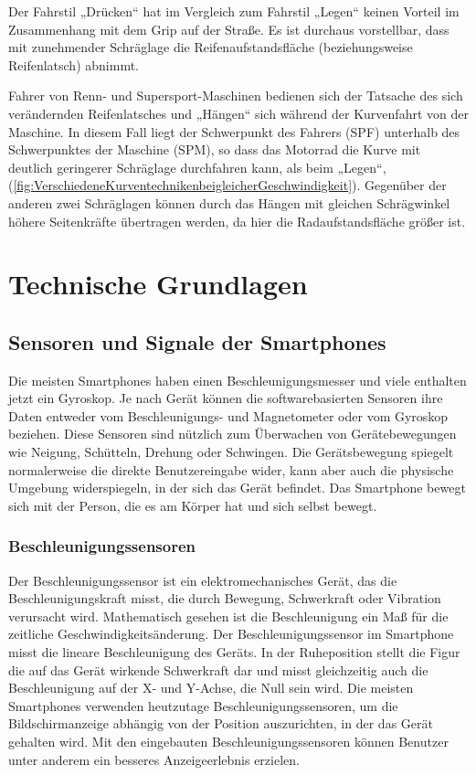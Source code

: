 Der Fahrstil „Drücken“ hat im Vergleich zum Fahrstil „Legen“ keinen Vorteil im Zusammenhang mit dem Grip auf der Straße. Es ist durchaus vorstellbar, dass mit zunehmender Schräglage die Reifenaufstandsfläche (beziehungsweise Reifenlatsch) abnimmt.

Fahrer von Renn- und Supersport-Maschinen bedienen sich der Tatsache des sich verändernden Reifenlatsches und „Hängen“ sich während der Kurvenfahrt von der Maschine. In diesem Fall liegt der Schwerpunkt des Fahrers (SPF) unterhalb des Schwerpunktes der Maschine (SPM), so dass das Motorrad die Kurve mit deutlich geringerer Schräglage durchfahren kann, als beim „Legen“, (\autoref{fig:VerschiedeneKurventechnikenbeigleicherGeschwindigkeit}). Gegenüber der anderen zwei Schräglagen können durch das \glqq Hängen\grqq{} mit gleichen Schrägwinkel höhere Seitenkräfte übertragen werden, da hier die Radaufstandsfläche größer ist.


%
%
%
%
\section{Technische Grundlagen} \label{Technik}



\subsection{Sensoren und Signale der Smartphones}

%
%
%
%
%
Die meisten Smartphones haben einen Beschleunigungsmesser und viele enthalten jetzt ein Gyroskop. Je nach Gerät können die softwarebasierten Sensoren ihre Daten entweder vom Beschleunigungs- und Magnetometer oder vom Gyroskop beziehen. Diese Sensoren sind nützlich zum Überwachen von Gerätebewegungen wie Neigung, Schütteln, Drehung oder Schwingen. Die Gerätsbewegung spiegelt normalerweise die direkte Benutzereingabe wider, kann aber auch die physische Umgebung widerspiegeln, in der sich das Gerät befindet. Das Smartphone bewegt sich mit der Person, die es am Körper hat und sich selbst bewegt.\citep{DevelopersMotionSen}



%
%
%
%


\subsubsection{Beschleunigungssensoren}

Der Beschleunigungssensor ist ein elektromechanisches Gerät, das die Beschleunigungskraft misst, die durch Bewegung, Schwerkraft oder Vibration verursacht wird. Mathematisch gesehen ist die Beschleunigung ein Maß für die zeitliche Geschwindigkeitsänderung.
Der Beschleunigungssensor im Smartphone misst die lineare Beschleunigung des Geräts. In der Ruheposition stellt die Figur die auf das Gerät wirkende Schwerkraft dar und misst gleichzeitig auch die Beschleunigung auf der X- und Y-Achse, die Null sein wird.
Die meisten Smartphones verwenden heutzutage Beschleunigungssensoren, um die Bildschirmanzeige abhängig von der Position auszurichten, in der das Gerät gehalten wird. Mit den eingebauten Beschleunigungssensoren können Benutzer unter anderem ein besseres Anzeigeerlebnis erzielen. \citep{Sharma2020}

